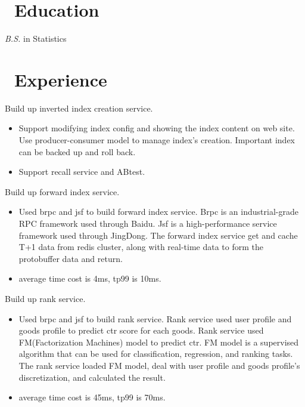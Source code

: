 \documentclass{resume}
\begin{document}



\section{\faGraduationCap\ Education}
\textit{B.S.} in Statistics

\section{\faUsers\ Experience}
Build up inverted index creation service.
\begin{itemize}
  \item Support modifying index config and showing the index content on web site. Use producer-consumer model to manage index's creation. Important index can be backed up and roll back.
  \item Support recall service and ABtest.
\end{itemize}
Build up forward index service.
\begin{itemize}
  \item Used brpc and jsf to build forward index service. Brpc is an industrial-grade RPC framework used through Baidu. Jsf is a high-performance service framework used through JingDong. The forward index service get and cache T+1 data from redis cluster, along with real-time data to form the protobuffer data and return.
  \item average time cost is 4ms, tp99 is 10ms.
\end{itemize}
Build up rank service.
\begin{itemize}
  \item Used brpc and jsf to build rank service. Rank service used user profile and goods profile to predict ctr score for each goods. Rank service used FM(Factorization Machines) model to predict ctr. FM model is a supervised algorithm that can be used for classification, regression, and ranking tasks. The rank service loaded FM model, deal with user profile and goods profile's discretization, and calculated the result.
  \item average time cost is 45ms, tp99 is 70ms.
\end{itemize}
\end{document}
